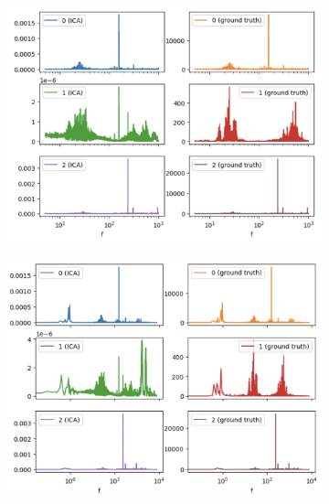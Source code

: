 \documentclass[10pt]{article}
\begin{document}
\begin{figure}[ht]
    \centering
    \hspace{-0.25in}
    \begin{subfigure}{0.4\textwidth}
        \centerline{\includegraphics[width=\textwidth]{single-sensor-ica-time-domain-phase-synchronized-without-filter-source-power-spectra}}
        \caption{\label{fig:single-sensor-ica-time-domain-phase-synchronized-without-filter-source-power-spectra-passband}}
    \end{subfigure}
    \begin{subfigure}{0.4\textwidth}
        \centerline{\includegraphics[width=\textwidth]{single-sensor-ica-time-domain-phase-synchronized-without-filter-source-power-spectra-full}}
        \caption{\label{fig:single-sensor-ica-time-domain-phase-synchronized-without-filter-source-power-spectra-full}}
    \end{subfigure}


\end{figure}
\end{document}
